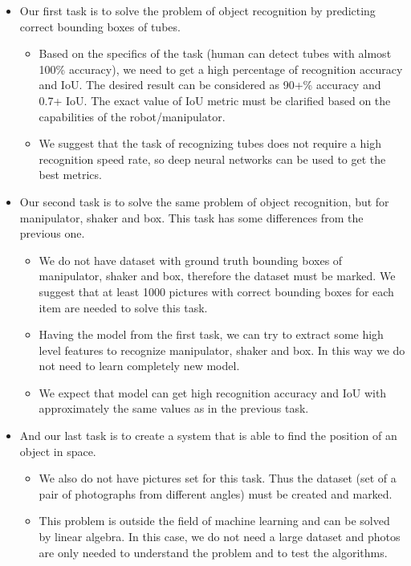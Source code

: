 \begin{itemize}
	\item Our first task is to solve the problem of object recognition by
	predicting correct bounding boxes of tubes.
	
	\begin{itemize}
		\item Based on the specifics of the task (human can detect tubes with almost 100\% accuracy), we need to get a high percentage of recognition accuracy and IoU. The desired result can be considered as 90+\% accuracy and 0.7+ IoU. The exact value of IoU metric must be clarified based on the capabilities of the robot/manipulator.
		
		\item We suggest that the task of recognizing tubes does not require a high recognition speed rate, so deep neural networks can be used to get the best metrics.
	\end{itemize}
	
	\item Our second task is to solve the same problem of object recognition, but for manipulator, shaker and box. This task has some differences from the previous one.
	
	\begin{itemize}
		\item We do not have dataset with ground truth bounding boxes of manipulator, shaker and box, therefore the dataset must be marked. We suggest that at least 1000 pictures with correct bounding boxes for each item are needed to solve this task.
		
		\item Having the model from the first task, we can try to extract some high level features to recognize manipulator, shaker and box. In this way we do not need to learn completely new model. 
		
		\item We expect that model can get high recognition accuracy and IoU with approximately the same values as in the previous task.
	\end{itemize}
	
	\item And our last task is to create a system that is able to find the position of an object in space.
	\begin{itemize}
		\item We also do not have pictures set for this task. Thus the dataset (set of a pair of photographs from different angles) must be created and marked. 
		\item This problem is outside the field of machine learning and can be solved by linear algebra. In this case, we do not need a large dataset and photos are only needed to understand the problem and to test the algorithms.
	\end{itemize}
\end{itemize} 
